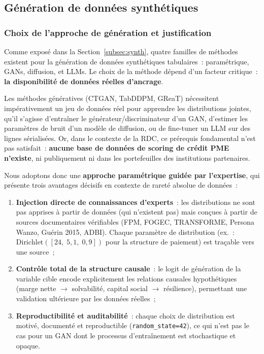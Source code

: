 \documentclass[12pt, a4paper, twocolumn]{article}
\begin{document}
\subsection{Génération de données synthétiques}
\label{subsec:generation}

\subsubsection{Choix de l'approche de génération et justification}
\label{subsubsec:choix_approche}

Comme exposé dans la Section~\ref{subsec:synth}, quatre familles de méthodes existent pour la génération de données synthétiques tabulaires~: paramétrique, GANs, diffusion, et LLMs. Le choix de la méthode dépend d'un facteur critique~: \textbf{la disponibilité de données réelles d'ancrage}.

Les méthodes génératives (CTGAN, TabDDPM, GReaT) nécessitent impérativement un jeu de données réel pour apprendre les distributions jointes, qu'il s'agisse d'entraîner le générateur/discriminateur d'un GAN, d'estimer les paramètres de bruit d'un modèle de diffusion, ou de fine-tuner un LLM sur des lignes sérialisées. Or, dans le contexte de la RDC, ce prérequis fondamental n'est pas satisfait~: \textbf{aucune base de données de scoring de crédit PME n'existe}, ni publiquement ni dans les portefeuilles des institutions partenaires.

Nous adoptons donc une \textbf{approche paramétrique guidée par l'expertise}, qui présente trois avantages décisifs en contexte de rareté absolue de données~:

\begin{enumerate}[leftmargin=*]
  \item \textbf{Injection directe de connaissances d'experts}~: les distributions ne sont pas apprises à partir de données (qui n'existent pas) mais conçues à partir de sources documentaires vérifiables (FPM, FOGEC, TRANSFORME, Persona Wanzo, Guérin 2015, ADBI). Chaque paramètre de distribution (ex.~: $\text{Dirichlet}([24,\;5{,}1,\;0{,}9])$ pour la structure de paiement) est traçable vers une source~;
  \item \textbf{Contrôle total de la structure causale}~: le logit de génération de la variable cible encode explicitement les relations causales hypothétiques (marge nette $\to$ solvabilité, capital social $\to$ résilience), permettant une validation ultérieure par les données réelles~;
  \item \textbf{Reproductibilité et auditabilité}~: chaque choix de distribution est motivé, documenté et reproductible (\texttt{random\_state=42}), ce qui n'est pas le cas pour un GAN dont le processus d'entraînement est stochastique et opaque.
\end{enumerate}
\end{document}
